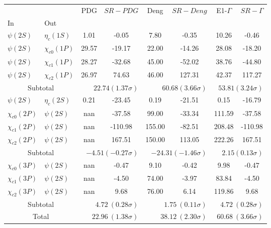 \begin{tabular}{|l|l|c|c|c|c|c|c|}%
\hline%
&&PDG&$SR-PDG$&Deng&$SR-Deng$&E1-$\Gamma$&$SR-\Gamma$\\%
In&Out&&&&&&\\%
\hline%
$\psi(2S)$&$\eta_{c}(1S)$&1.01&-0.05&7.80&-0.35&10.26&-0.46\\%
$\psi(2S)$&$\chi_{c0}(1P)$&29.57&-19.17&22.00&-14.26&28.08&-18.20\\%
$\psi(2S)$&$\chi_{c1}(1P)$&28.27&-32.68&45.00&-52.02&38.76&-44.80\\%
$\psi(2S)$&$\chi_{c2}(1P)$&26.97&74.63&46.00&127.31&42.37&117.27\\%
\hline%
\hline%
\multicolumn{2}{|c|}{Subtotal}&\multicolumn{2}{|r|}{$22.74 (1.37\sigma)$}&\multicolumn{2}{|r|}{$60.68 (3.66\sigma)$}&\multicolumn{2}{|r|}{$53.81 (3.24\sigma)$}\\%
\hline%
\hline%
$\psi(2S)$&$\eta_{c}(2S)$&0.21&-23.45&0.19&-21.51&0.15&-16.79\\%
$\chi_{c0}(2P)$&$\psi(2S)$&nan&-37.58&99.00&-33.34&111.59&-37.58\\%
$\chi_{c1}(2P)$&$\psi(2S)$&nan&-110.98&155.00&-82.51&208.48&-110.98\\%
$\chi_{c2}(2P)$&$\psi(2S)$&nan&167.51&150.00&113.05&222.26&167.51\\%
\hline%
\hline%
\multicolumn{2}{|c|}{Subtotal}&\multicolumn{2}{|r|}{$-4.51 (-0.27\sigma)$}&\multicolumn{2}{|r|}{$-24.31 (-1.46\sigma)$}&\multicolumn{2}{|r|}{$2.15 (0.13\sigma)$}\\%
\hline%
\hline%
$\chi_{c0}(3P)$&$\psi(2S)$&nan&-0.47&9.10&-0.42&9.98&-0.47\\%
$\chi_{c1}(3P)$&$\psi(2S)$&nan&-4.50&74.00&-3.97&83.84&-4.50\\%
$\chi_{c2}(3P)$&$\psi(2S)$&nan&9.68&76.00&6.14&119.86&9.68\\%
\hline%
\hline%
\multicolumn{2}{|c|}{Subtotal}&\multicolumn{2}{|r|}{$4.72~(0.28\sigma)$}&\multicolumn{2}{|r|}{$1.75~(0.11\sigma)$}&\multicolumn{2}{|r|}{$4.72~(0.28\sigma)$}\\%
\hline%
\hline%
\multicolumn{2}{|c|}{Total}&\multicolumn{2}{|r|}{$22.96~(1.38\sigma)$}&\multicolumn{2}{|r|}{$38.12~(2.30\sigma)$}&\multicolumn{2}{|r|}{$60.68~(3.66\sigma)$}\\%
\hline%
\end{tabular}